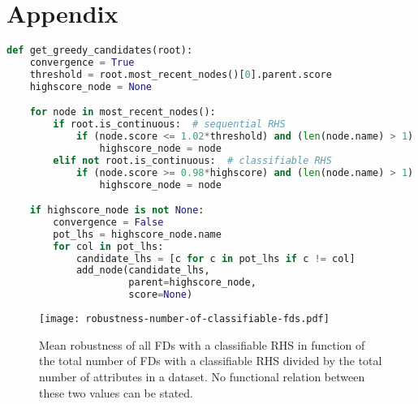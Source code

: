 \section{Appendix}

\begin{lstlisting}[caption={`Greedy' Candidate Generation in DepDetector},captionpos=b,language=Python,label=lst:greedy-depdetector]
def get_greedy_candidates(root):
    convergence = True
    threshold = root.most_recent_nodes()[0].parent.score
    highscore_node = None

    for node in most_recent_nodes():
        if root.is_continuous:  # sequential RHS
            if (node.score <= 1.02*threshold) and (len(node.name) > 1):
                highscore_node = node
        elif not root.is_continuous:  # classifiable RHS
            if (node.score >= 0.98*highscore) and (len(node.name) > 1):
                highscore_node = node

    if highscore_node is not None:
        convergence = False
        pot_lhs = highscore_node.name
        for col in pot_lhs:
            candidate_lhs = [c for c in pot_lhs if c != col]
            add_node(candidate_lhs,
                     parent=highscore_node,
                     score=None)
\end{lstlisting}

\begin{figure}[ht]
     \centering
     \texttt{[image: robustness-number-of-classifiable-fds.pdf]}
     \caption{Mean robustness of all FDs with a classifiable RHS in function of the total number of FDs with a classifiable RHS divided by the total number of attributes in a dataset. No functional relation between these two values can be stated.}
     \label{fig:robustness-number-of-classifiable-fds}
 \end{figure}
